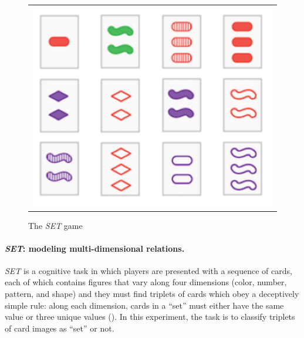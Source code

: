 

\begin{figure}
	\vskip-5pt
	\begin{tabular}{c}
		\includegraphics[width=.25\textwidth]{figures/set_example}\\[-5pt]
	\end{tabular}
	\caption{\footnotesize The \textit{SET} game}\label{fig:set_example}
\end{figure}
\paragraph{\textit{SET}: modeling multi-dimensional relations.}
\textit{SET} is a cognitive task in which players are presented with a sequence of cards, each of which contains figures that vary along four dimensions (color, number, pattern, and shape) and they must find triplets of cards which obey a deceptively simple rule: along each dimension, cards in a ``set'' must either have the same value or three unique values (). %
In this experiment, the task is to classify triplets of card images as ``set'' or not.

